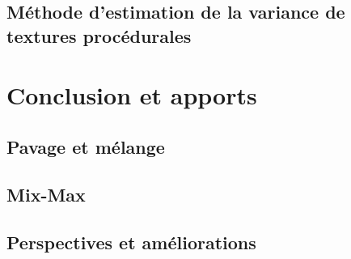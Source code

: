 \documentclass{article}
\begin{document}
\subsection{Méthode d'estimation de la variance de textures procédurales}

\section{Conclusion et apports}

\subsection{Pavage et mélange}

\subsection{Mix-Max}

\subsection{Perspectives et améliorations}

\clearpage

\printbibliography
\end{document}

